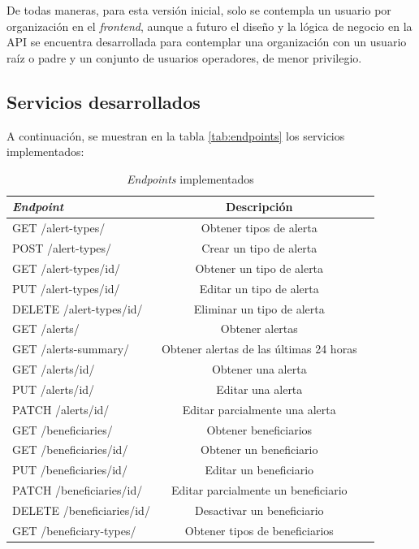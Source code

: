 De todas maneras, para esta versión inicial, solo se contempla un usuario por organización en el \textit{frontend}, aunque a futuro el diseño y la lógica de negocio en la API se encuentra desarrollada para contemplar una organización con un usuario raíz o padre y un conjunto de usuarios operadores, de menor privilegio.

\subsection{Servicios desarrollados}

A continuación, se muestran en la tabla \ref{tab:endpoints} los servicios implementados:

\begin{table}[H]
	\centering
	\caption[\textit{Servicios}]{\textit{Endpoints} implementados}
	\begin{tabular}{l c c}    
		\toprule
		\textbf{\textit{Endpoint}} 	 & \textbf{Descripción} \\
		\midrule
		GET /alert-types/ & Obtener tipos de alerta  \\		
		POST /alert-types/& Crear un tipo de alerta		\\		
		GET /alert-types/{id}/ & Obtener un tipo de alerta \\
		PUT /alert-types/{id}/ & Editar un tipo de alerta		\\
		DELETE /alert-types/{id}/ & Eliminar un tipo de alerta  \\
		\hline
		GET /alerts/ & Obtener alertas  \\		
		GET /alerts-summary/ & Obtener alertas de las últimas 24 horas \\		
		GET /alerts/{id}/ & Obtener una alerta \\
		PUT /alerts/{id}/ & Editar una alerta		\\
		PATCH /alerts/{id}/ & Editar parcialmente una alerta   \\
		\hline
		GET /beneficiaries/ & Obtener beneficiarios  \\			
		GET /beneficiaries/{id}/ & Obtener un beneficiario \\
		PUT /beneficiaries/{id}/ & Editar un beneficiario		\\
		PATCH /beneficiaries/{id}/ & Editar parcialmente un beneficiario   \\
		DELETE /beneficiaries/{id}/ & Desactivar un beneficiario \\
		\hline
		GET /beneficiary-types/ & Obtener tipos de beneficiarios  \\			

\end{tabular}
\end{table}
